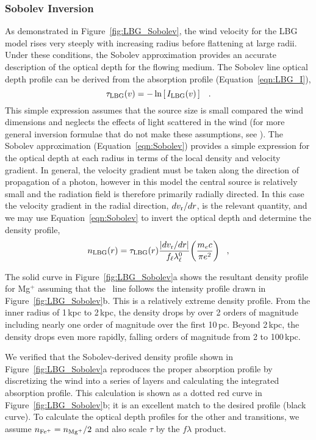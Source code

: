 \documentclass[12pt,preprint]{aastex}
\begin{document}
\subsubsection{Sobolev Inversion}
\label{sec:Sobolev}

As demonstrated in Figure~\ref{fig:LBG_Sobolev}, the wind velocity for
the LBG model rises very steeply with increasing radius before
flattening at large radii.  Under these conditions, the Sobolev
approximation provides an accurate description of the optical depth
for the flowing medium. 
The Sobolev line optical depth profile can be derived from
the absorption profile (Equation~\ref{eqn:LBG_I}), 
\begin{equation}
\tau_{\rm LBG}(v) = -\ln \left [ \, I_{\rm LBG}(v) \, \right ] \;\;\; .
\label{eqn:tauLBG}
\end{equation}
This simple expression assumes that the source size is small compared the wind dimensions
and neglects the effects of light scattered in the wind (for more general inversion
formulae that do not make these assumptions, see \citet{Kasen_2002}).
The Sobolev approximation (Equation~\ref{eqn:Sobolev}) provides a simple expression for the optical
depth at each radius in terms of the local density and velocity gradient.  In general, the velocity 
 gradient must be taken along the direction of propagation of a photon, however
in this model the central source is relatively small  and the radiation
field is therefore primarily radially directed.  In this 
case the velocity gradient in the radial direction, $dv_{\rm r}/dr$, is the relevant quantity, and 
we may use Equation~\ref{eqn:Sobolev}  to invert
the optical depth and determine the density profile,
\begin{equation}
n_{\rm LBG}(r) =  \tau_{\rm LBG}(r)  \frac{ |dv_{\rm r}/dr |}{f_\ell  \lambda^0_\ell}
\biggl( \frac{ m_e c}{\pi e^2} \biggl)
 \;\;\; ,
\label{eqn:nSobolev}
\end{equation}


The solid curve in Figure~\ref{fig:LBG_Sobolev}a shows the
resultant density profile for Mg$^+$ assuming that the \mgiia\ line
follows the intensity profile drawn in Figure~\ref{fig:LBG_Sobolev}b. 
This is a relatively extreme density profile.  From the inner radius
of 1\,kpc to 2\,kpc, the density drops by over 2 orders of
magnitude including nearly one order of magnitude over the first
10\,pc.  Beyond 2\,kpc, the density drops even more rapidly, falling
orders of magnitude from 2 to 100\,kpc.

We verified that the Sobolev-derived density profile shown in
Figure~\ref{fig:LBG_Sobolev}a
reproduces the proper
absorption profile by discretizing the wind into a series of layers
and calculating the integrated absorption profile.  This
calculation is shown as a dotted red curve in
Figure~\ref{fig:LBG_Sobolev}b; it is an excellent
match to the desired profile (black curve).
To calculate the optical depth profiles for the other  and
 transitions, we
assume $n_{\rm Fe^+} = n_{\rm Mg^+}/2$ and also scale $\tau$ by the $f\lambda$ product.
\end{document}
